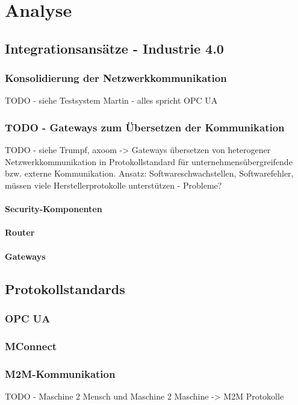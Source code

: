 \chapter{Analyse}

\section{Integrationsansätze - Industrie 4.0}
\subsection{Konsolidierung der Netzwerkkommunikation}

TODO - siehe Testsystem Martin - alles spricht OPC UA

\subsection{TODO - Gateways zum Übersetzen der Kommunikation}

TODO - siehe Trumpf, axoom -> Gateways übersetzen von heterogener Netzwerkkommunikation in Protokollstandard für unternehmensübergreifende bzw. externe Kommunikation.
Ansatz: Softwareschwachstellen, Softwarefehler, müssen viele Herstellerprotokolle unterstützen - Probleme?

\subsubsection{Security-Komponenten}
\subsubsection{Router}
\subsubsection{Gateways}

\section{Protokollstandards}
\subsection{OPC UA}
\subsection{MConnect}
\subsection{M2M-Kommunikation}
TODO - Maschine 2 Mensch und Maschine 2 Maschine -> M2M Protokolle
